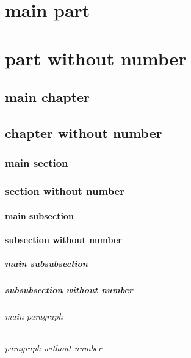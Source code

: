 \documentclass{article}
\begin{document}
\part[short title]{main part}
\part*{part without number}

\chapter[short title]{main chapter}
\chapter*{chapter without number}

\section[short title]{main section}
\section*{section without number}

\subsection[short title]{main subsection}
\subsection*{subsection without number}

\subsubsection[short title]{main subsubsection}
\subsubsection*{subsubsection without number}

\paragraph[short title]{main paragraph}
\paragraph*{paragraph without number}
\end{document}
